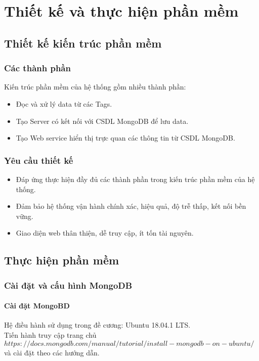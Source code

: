 \headerandfooterconfig

\chapter{Thiết kế và thực hiện phần mềm}

\section{Thiết kế kiến trúc phần mềm}
\subsection{Các thành phần}
Kiến trúc phần mềm của hệ thống gồm nhiều thành phần:
\begin{itemize}
	\item Đọc và xử lý data từ các Tags.
	\item Tạo Server có kết nối với CSDL MongoDB để lưu data.
	\item Tạo Web service hiển thị trực quan các thông tin từ CSDL MongoDB.
\end{itemize}
\subsection{Yêu cầu thiết kế}
\begin{itemize}
	\item Đáp ứng thực hiện đầy đủ các thành phần trong kiến trúc phần mềm của hệ thống.
	\item Đảm bảo hệ thống vận hành chính xác, hiệu quả, độ trễ thấp, kết nối bền vững.
	\item Giao diện web thân thiện, dễ truy cập, ít tốn tài nguyên.
\end{itemize}

\section{Thực hiện phần mềm}
\subsection{Cài đặt và cấu hình MongoDB}
\subsubsection{Cài đặt MongoBD}
Hệ điều hành sử dụng trong đề cương: Ubuntu 18.04.1 LTS.\\
Tiến hành truy cập trang chủ $https://docs.mongodb.com/manual/tutorial/install-mongodb-on-ubuntu/$ và cài đặt theo các hướng dẫn.
\label{ref{fig4_1}}
